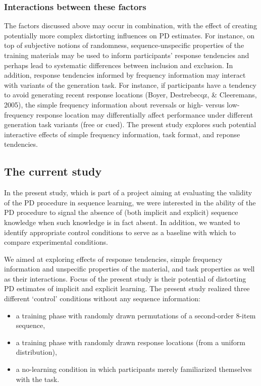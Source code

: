 \documentclass[
  english,
  man]{apa6}
\providecommand{\tightlist}{%
  \setlength{\itemsep}{0pt}\setlength{\parskip}{0pt}}
\begin{document}
\hypertarget{interactions-between-these-factors}{%
\subsubsection{Interactions between these factors}\label{interactions-between-these-factors}}

The factors discussed above may occur in combination, with the effect of creating potentially more complex distorting influences on PD estimates.
For instance, on top of subjective notions of randomness, sequence-unspecific properties of the training materials may be used to inform participants' response tendencies
and perhaps lead to systematic differences between inclusion and exclusion.
In addition, response tendencies informed by frequency information may interact with variants of the generation task.
For instance, if participants have a tendency to avoid generating recent response locations (Boyer, Destrebecqz, \& Cleeremans, 2005),
the simple frequency information about reversals or high- versus low-frequency response location may differentially affect performance under different generation task variants (free or cued).
The present study explores such potential interactive effects of simple frequency information, task format, and reponse tendencies.

\hypertarget{the-current-study}{%
\subsection{The current study}\label{the-current-study}}

In the present study, which is part of a project aiming at evaluating the validity of the PD procedure in sequence learning, we were interested in the ability of the PD procedure to signal the absence of (both implicit and explicit) sequence knowledge when such knowledge is in fact absent.
In addition, we wanted to identify appropriate control conditions to serve as a baseline with which to compare experimental conditions.

We aimed at exploring effects of response tendencies, simple frequency information and unspecific properties of the material, and task properties as well as their interactions.
Focus of the present study is their potential of distorting PD estimates of implicit and explicit learning.
The present study realized three different `control' conditions without any sequence information:

\begin{itemize}
\tightlist
\item
  a training phase with randomly drawn permutations of a second-order 8-item sequence,
\item
  a training phase with randomly drawn response locations (from a uniform distribution),
\item
  a no-learning condition in which participants merely familiarized themselves with the task.
\end{itemize}
\end{document}
